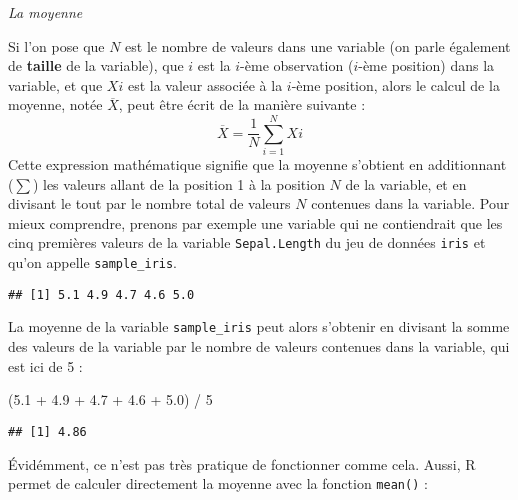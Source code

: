 \documentclass[
]{book}
\newenvironment{Shaded}{\begin{snugshade}}{\end{snugshade}}
\newcommand{\DecValTok}[1]{\textcolor[rgb]{0.00,0.00,0.81}{#1}}
\newcommand{\FloatTok}[1]{\textcolor[rgb]{0.00,0.00,0.81}{#1}}
\newcommand{\NormalTok}[1]{#1}
\newcommand{\OtherTok}[1]{\textcolor[rgb]{0.56,0.35,0.01}{#1}}
\newcommand{\SpecialCharTok}[1]{\textcolor[rgb]{0.00,0.00,0.00}{#1}}
\begin{document}
\emph{La moyenne}

Si l'on pose que \(N\) est le nombre de valeurs dans une variable (on parle également de \textbf{taille} de la variable), que \(i\) est la \(i\)-ème observation (\(i\)-ème position) dans la variable, et que \(X{i}\) est la valeur associée à la \(i\)-ème position, alors le calcul de la moyenne, notée \(\overline{X}\), peut être écrit de la manière suivante :
\[\overline{X} = \frac{1}{N}\sum_{i=1}^{N} X{i}\]
Cette expression mathématique signifie que la moyenne s'obtient en additionnant (\(\sum\)) les valeurs allant de la position 1 à la position \(N\) de la variable, et en divisant le tout par le nombre total de valeurs \(N\) contenues dans la variable. Pour mieux comprendre, prenons par exemple une variable qui ne contiendrait que les cinq premières valeurs de la variable \texttt{Sepal.Length} du jeu de données \texttt{iris} et qu'on appelle \texttt{sample\_iris}.

\begin{Shaded}
\end{Shaded}

\begin{verbatim}
## [1] 5.1 4.9 4.7 4.6 5.0
\end{verbatim}

La moyenne de la variable \texttt{sample\_iris} peut alors s'obtenir en divisant la somme des valeurs de la variable par le nombre de valeurs contenues dans la variable, qui est ici de 5 :

\begin{Shaded}
\begin{Highlighting}[]
\NormalTok{(}\FloatTok{5.1} \SpecialCharTok{+} \FloatTok{4.9} \SpecialCharTok{+} \FloatTok{4.7} \SpecialCharTok{+} \FloatTok{4.6} \SpecialCharTok{+} \FloatTok{5.0}\NormalTok{) }\SpecialCharTok{/} \DecValTok{5}
\end{Highlighting}
\end{Shaded}

\begin{verbatim}
## [1] 4.86
\end{verbatim}

Évidémment, ce n'est pas très pratique de fonctionner comme cela. Aussi, R permet de calculer directement la moyenne avec la fonction \texttt{mean()} :
\end{document}
